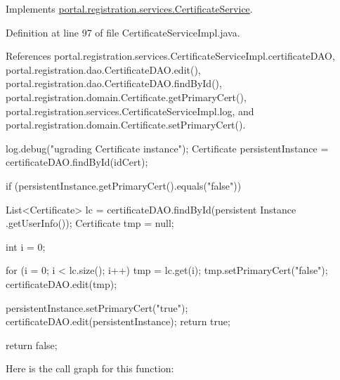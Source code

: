 Implements \hyperlink{interfaceportal_1_1registration_1_1services_1_1CertificateService_a31323ccb59ca777ac0bc7341454cbb07}{portal.registration.services.CertificateService}.



Definition at line 97 of file CertificateServiceImpl.java.



References portal.registration.services.CertificateServiceImpl.certificateDAO, portal.registration.dao.CertificateDAO.edit(), portal.registration.dao.CertificateDAO.findById(), portal.registration.domain.Certificate.getPrimaryCert(), portal.registration.services.CertificateServiceImpl.log, and portal.registration.domain.Certificate.setPrimaryCert().


\begin{DoxyCode}
                                              {
                log.debug("ugrading Certificate instance");
                Certificate persistentInstance = certificateDAO.findById(idCert);
      

                if (persistentInstance.getPrimaryCert().equals("false")) {
                        List<Certificate> lc = certificateDAO.findById(persistent
      Instance
                                        .getUserInfo());
                        Certificate tmp = null;

                        int i = 0;

                        for (i = 0; i < lc.size(); i++) {
                                tmp = lc.get(i);
                                tmp.setPrimaryCert("false");
                                certificateDAO.edit(tmp);
                        }

                        persistentInstance.setPrimaryCert("true");
                        certificateDAO.edit(persistentInstance);
                        return true;
                }

                return false;
        }
\end{DoxyCode}


Here is the call graph for this function:




